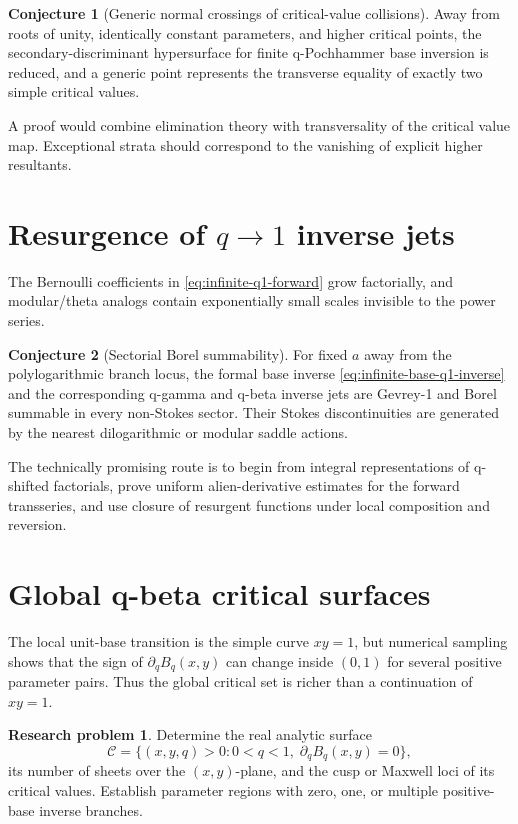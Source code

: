 \documentclass[11pt,letterpaper,oneside,openany]{book}
\theoremstyle{definition}
\newtheorem{researchproblem}{Research problem}[chapter]
\newtheorem{conjecture}{Conjecture}[chapter]
\theoremstyle{remark}
\begin{document}
\begin{conjecture}[Generic normal crossings of critical-value collisions]
Away from roots of unity, identically constant parameters, and higher critical
points, the secondary-discriminant hypersurface for finite q-Pochhammer base
inversion is reduced, and a generic point represents the transverse equality
of exactly two simple critical values.
\end{conjecture}

A proof would combine elimination theory with transversality of the critical
value map.  Exceptional strata should correspond to the vanishing of explicit
higher resultants.

\section{Resurgence of \(q\to1\) inverse jets}
The Bernoulli coefficients in \cref{eq:infinite-q1-forward} grow factorially,
and modular/theta analogs contain exponentially small scales invisible to the
power series.

\begin{conjecture}[Sectorial Borel summability]
For fixed \(a\) away from the polylogarithmic branch locus, the formal base
inverse \cref{eq:infinite-base-q1-inverse} and the corresponding q-gamma and
q-beta inverse jets are Gevrey-1 and Borel summable in every non-Stokes sector.
Their Stokes discontinuities are generated by the nearest dilogarithmic or
modular saddle actions.
\end{conjecture}

The technically promising route is to begin from integral representations of
q-shifted factorials, prove uniform alien-derivative estimates for the forward
transseries, and use closure of resurgent functions under local composition and
reversion.

\section{Global q-beta critical surfaces}
The local unit-base transition is the simple curve \(xy=1\), but numerical
sampling shows that the sign of \(\partial_qB_q(x,y)\) can change inside
\((0,1)\) for several positive parameter pairs.  Thus the global critical set
is richer than a continuation of \(xy=1\).

\begin{researchproblem}
Determine the real analytic surface
\[
 \mathcal C=\{(x,y,q)>0:0<q<1,
 \;\partial_qB_q(x,y)=0\},
\]
its number of sheets over the \((x,y)\)-plane, and the cusp or Maxwell loci of
its critical values.  Establish parameter regions with zero, one, or multiple
positive-base inverse branches.
\end{researchproblem}
\end{document}
